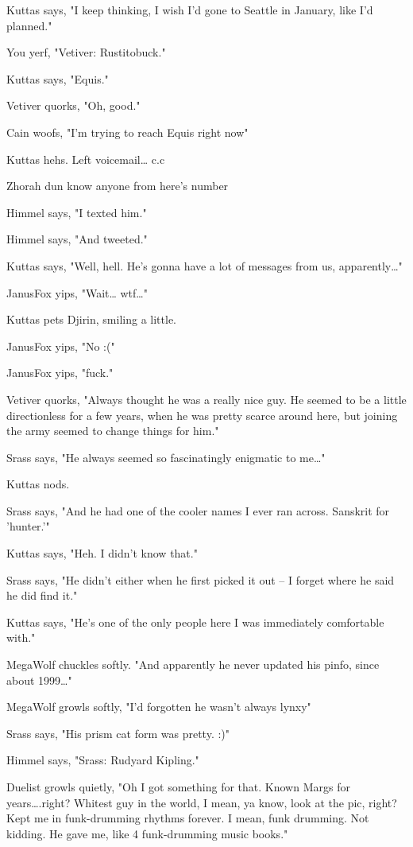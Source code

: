 \begin{hangparas}{2em}{1}
Kuttas says, "I keep thinking, I wish I'd gone to Seattle in January, like I'd planned."

You yerf, "Vetiver: Rustitobuck."

Kuttas says, "Equis."

Vetiver quorks, "Oh, good."

Cain woofs, "I'm trying to reach Equis right now"

Kuttas hehs. Left voicemail\ldots{} c.c

Zhorah dun know anyone from here's number

Himmel says, "I texted him."

Himmel says, "And tweeted."

Kuttas says, "Well, hell. He's gonna have a lot of messages from us, apparently\ldots{}"

JanusFox yips, "Wait\ldots{} wtf\ldots{}"

Kuttas pets Djirin, smiling a little.

JanusFox yips, "No :("

JanusFox yips, "fuck."

Vetiver quorks, "Always thought he was a really nice guy. He seemed to be a little directionless for a few years, when he was pretty scarce around here, but joining the army seemed to change things for him."

Srass says, "He always seemed so fascinatingly enigmatic to me\ldots{}"

Kuttas nods.

Srass says, "And he had one of the cooler names I ever ran across.  Sanskrit for 'hunter.'"

Kuttas says, "Heh. I didn't know that."

Srass says, "He didn't either when he first picked it out -- I forget where he said he did find it."

Kuttas says, "He's one of the only people here I was immediately comfortable with."

MegaWolf chuckles softly. "And apparently he never updated his pinfo, since about 1999\ldots{}"

MegaWolf growls softly, "I'd forgotten he wasn't always lynxy"

Srass says, "His prism cat form was pretty. :)"

Himmel says, "Srass: Rudyard Kipling."

Duelist growls quietly, "Oh I got something for that. Known Margs for years\ldots{}.right? Whitest guy in the world, I mean, ya know, look at the pic, right? Kept me in funk-drumming rhythms forever. I mean, funk drumming. Not kidding. He gave me, like 4 funk-drumming music books."


\end{hangparas}
